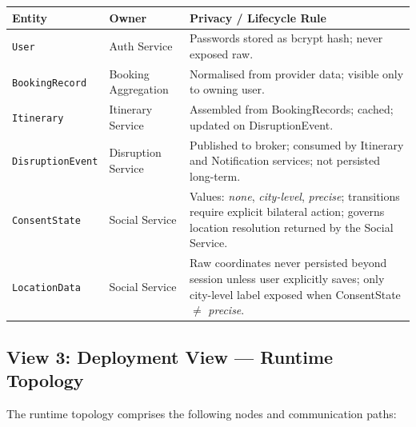 \documentclass[12pt,a4paper]{article}
\begin{document}
\begin{tabularx}{\textwidth}{L{3.5cm}L{4cm}X}
\toprule
\textbf{Entity} & \textbf{Owner} & \textbf{Privacy / Lifecycle Rule} \\
\midrule
\texttt{User} & Auth Service & Passwords stored as bcrypt hash; never exposed raw. \\
\texttt{BookingRecord} & Booking Aggregation & Normalised from provider data; visible only to
  owning user. \\
\texttt{Itinerary} & Itinerary Service & Assembled from BookingRecords; cached; updated on
  DisruptionEvent. \\
\texttt{DisruptionEvent} & Disruption Service & Published to broker; consumed by Itinerary and
  Notification services; not persisted long-term. \\
\texttt{ConsentState} & Social Service & Values: \textit{none}, \textit{city-level},
  \textit{precise}; transitions require explicit bilateral action; governs location resolution
  returned by the Social Service. \\
\texttt{LocationData} & Social Service & Raw coordinates never persisted beyond session unless
  user explicitly saves; only city-level label exposed when ConsentState $\neq$ \textit{precise}. \\
\bottomrule
\end{tabularx}

\subsection{View 3: Deployment View — Runtime Topology}

The runtime topology comprises the following nodes and communication paths:
\end{document}
